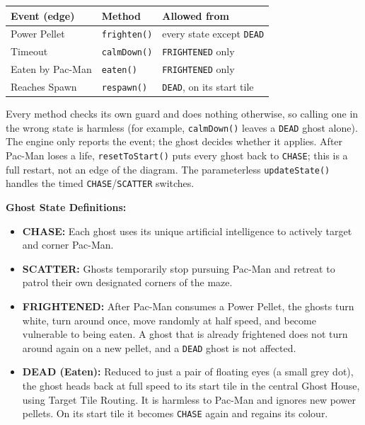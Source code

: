 \documentclass[11pt, a4paper]{article}
\begin{document}
\begin{itemize}
    \vspace{0.1cm}
    \begin{tabular}{@{}lll@{}}
        \toprule
        \textbf{Event (edge)} & \textbf{Method} & \textbf{Allowed from} \\
        \midrule
        Power Pellet & \texttt{frighten()} & every state except \texttt{DEAD} \\
        Timeout & \texttt{calmDown()} & \texttt{FRIGHTENED} only \\
        Eaten by Pac-Man & \texttt{eaten()} & \texttt{FRIGHTENED} only \\
        Reaches Spawn & \texttt{respawn()} & \texttt{DEAD}, on its start tile \\
        \bottomrule
    \end{tabular}
    \vspace{0.1cm}

    Every method checks its own guard and does nothing otherwise, so calling one in the wrong state is harmless (for example, \texttt{calmDown()} leaves a \texttt{DEAD} ghost alone). The engine only reports the event; the ghost decides whether it applies. After Pac-Man loses a life, \texttt{resetToStart()} puts every ghost back to \texttt{CHASE}; this is a full restart, not an edge of the diagram. The parameterless \texttt{updateState()} handles the timed \texttt{CHASE}/\texttt{SCATTER} switches.
    
    \vspace{0.2cm}
    \textbf{Ghost State Definitions:}
    \begin{itemize}
        \item \textbf{CHASE:} Each ghost uses its unique artificial intelligence to actively target and corner Pac-Man.
        \item \textbf{SCATTER:} Ghosts temporarily stop pursuing Pac-Man and retreat to patrol their own designated corners of the maze.
        \item \textbf{FRIGHTENED:} After Pac-Man consumes a Power Pellet, the ghosts turn white, turn around once, move randomly at half speed, and become vulnerable to being eaten. A ghost that is already frightened does not turn around again on a new pellet, and a \texttt{DEAD} ghost is not affected.
        \item \textbf{DEAD (Eaten):} Reduced to just a pair of floating eyes (a small grey dot), the ghost heads back at full speed to its start tile in the central Ghost House, using Target Tile Routing. It is harmless to Pac-Man and ignores new power pellets. On its start tile it becomes \texttt{CHASE} again and regains its colour.
    \end{itemize}


\end{itemize}
\end{document}
